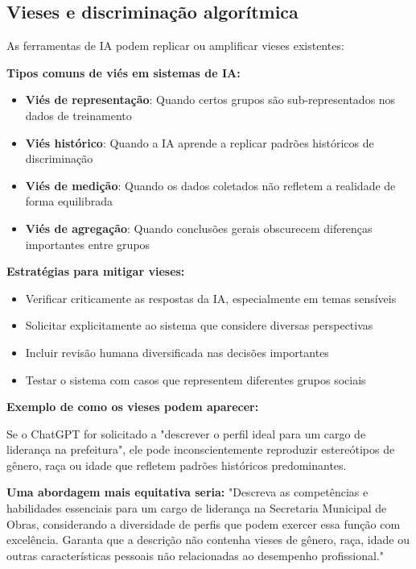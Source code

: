 \documentclass[12pt,a4paper]{book}
\begin{document}
\subsection{Vieses e discriminação algorítmica}

As ferramentas de IA podem replicar ou amplificar vieses existentes:

\textbf{Tipos comuns de viés em sistemas de IA:}
\begin{itemize}
    \item \textbf{Viés de representação}: Quando certos grupos são sub-representados nos dados de treinamento
    
    \item \textbf{Viés histórico}: Quando a IA aprende a replicar padrões históricos de discriminação
    
    \item \textbf{Viés de medição}: Quando os dados coletados não refletem a realidade de forma equilibrada
    
    \item \textbf{Viés de agregação}: Quando conclusões gerais obscurecem diferenças importantes entre grupos
\end{itemize}

\textbf{Estratégias para mitigar vieses:}
\begin{itemize}
    \item Verificar criticamente as respostas da IA, especialmente em temas sensíveis
    
    \item Solicitar explicitamente ao sistema que considere diversas perspectivas
    
    \item Incluir revisão humana diversificada nas decisões importantes
    
    \item Testar o sistema com casos que representem diferentes grupos sociais
\end{itemize}

\begin{tcolorbox}[exemplo]
\textbf{Exemplo de como os vieses podem aparecer:}

Se o ChatGPT for solicitado a "descrever o perfil ideal para um cargo de liderança na prefeitura", ele pode inconscientemente reproduzir estereótipos de gênero, raça ou idade que refletem padrões históricos predominantes.

\textbf{Uma abordagem mais equitativa seria:}
"Descreva as competências e habilidades essenciais para um cargo de liderança na Secretaria Municipal de Obras, considerando a diversidade de perfis que podem exercer essa função com excelência. Garanta que a descrição não contenha vieses de gênero, raça, idade ou outras características pessoais não relacionadas ao desempenho profissional."
\end{tcolorbox}
\end{document}
